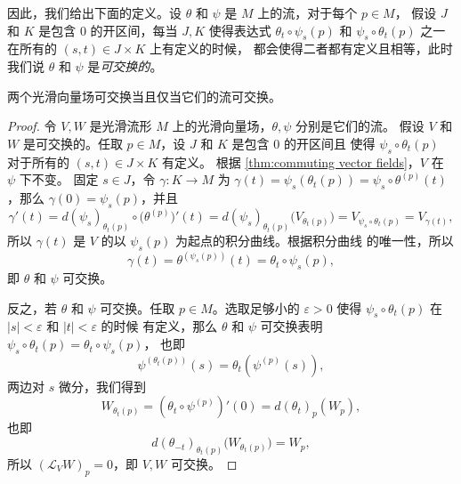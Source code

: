 因此，我们给出下面的定义。设 $\theta$ 和 $\psi$ 是 $M$ 上的流，对于每个 $p\in M$，
假设 $J$ 和 $K$ 是包含 $0$ 的开区间，每当 $J,K$ 使得表达式 $\theta_t\circ\psi_s(p)$
和 $\psi_s\circ\theta_t(p)$ 之一在所有的 $(s,t)\in J\times K$ 上有定义的时候，
都会使得二者都有定义且相等，此时我们说 $\theta$ 和 $\psi$ 是\emph{可交换的}。

\begin{theorem}
  两个光滑向量场可交换当且仅当它们的流可交换。
\end{theorem}
\begin{proof}
  令 $V,W$ 是光滑流形 $M$ 上的光滑向量场，$\theta,\psi$ 分别是它们的流。
  假设 $V$ 和 $W$ 是可交换的。任取 $p\in M$，设 $J$ 和 $K$ 是包含 $0$ 的开区间且
  使得 $\psi_s\circ\theta_t(p)$ 对于所有的 $(s,t)\in J\times K$ 有定义。
  根据 \autoref{thm:commuting vector fields}，$V$ 在 $\psi$ 下不变。
  固定 $s\in J$，令 $\gamma:K\to M$ 为 $\gamma(t)=\psi_s(\theta_t(p))=\psi_s\circ\theta^{(p)}(t)$，那么
  $\gamma(0)=\psi_s(p)$，并且
  \[
    \gamma'(t)=d(\psi_s)_{\theta_t(p)}\circ\bigl(\theta^{(p)}\bigr)'(t)
    =d(\psi_s)_{\theta_t(p)}\bigl(V_{\theta_t(p)}\bigr)
    =V_{\psi_s\circ\theta_t(p)}=V_{\gamma(t)},
  \]
  所以 $\gamma(t)$ 是 $V$ 的以 $\psi_s(p)$ 为起点的积分曲线。根据积分曲线
  的唯一性，所以
  \[
    \gamma(t)=\theta^{\left(\psi_s(p)\right)}(t)=\theta_t\circ\psi_s(p),
  \]
  即 $\theta$ 和 $\psi$ 可交换。

  反之，若 $\theta$ 和 $\psi$ 可交换。任取 $p\in M$。选取足够小的 $\varepsilon>0$
  使得 $\psi_s\circ\theta_t(p)$ 在 $|s|<\varepsilon$ 和 $|t|<\varepsilon$ 的时候
  有定义，那么 $\theta$ 和 $\psi$ 可交换表明 $\psi_s\circ\theta_t(p)=\theta_t\circ\psi_s(p)$，
  也即
  \[
    \psi^{\left(\theta_t(p)\right)}(s)=\theta_t\left(\psi^{(p)}(s)\right),
  \]
  两边对 $s$ 微分，我们得到
  \[
    W_{\theta_t(p)}= \left(\theta_t\circ\psi^{(p)}\right)'(0) = d(\theta_t)_{p}\left(W_{p}\right),
  \]
  也即
  \[
    d(\theta_{-t})_{\theta_t(p)}\bigl(W_{\theta_t(p)}\bigr)=W_p,
  \]
  所以 $(\mathcal{L}_VW)_p=0$，即 $V,W$ 可交换。
\end{proof}









